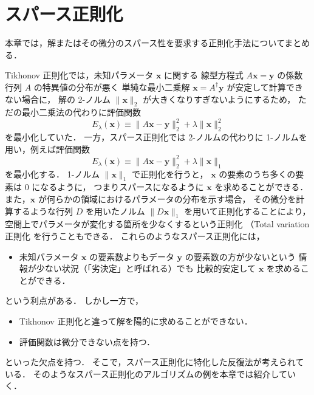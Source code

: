 %

\chapter{スパース正則化}\label{chap:regularization_sparse}

本章では，解またはその微分のスパース性を要求する正則化手法についてまとめる．

Tikhonov 正則化では，未知パラメータ $\bm{x}$ に関する
線型方程式 $A \bm{x} = \bm{y}$ の係数行列 $A$ の特異値の分布が悪く
単純な最小二乗解 $\bm{x} = A^\dagger \bm{y}$ が安定して計算できない場合に，
解の 2-ノルム $\|\bm{x}\|_2$ が大きくなりすぎないようにするため，
ただの最小二乗法の代わりに評価関数
\begin{equation}
    E_{\lambda}(\bm{x}) \equiv \|A \bm{x} - \bm{y}\|_2^2 + \lambda \|\bm{x}\|_2^2
\end{equation}
を最小化していた．
一方，スパース正則化では 2-ノルムの代わりに 1-ノルムを用い，例えば評価関数
\begin{equation}
    E_{\lambda}(\bm{x}) \equiv \|A \bm{x} - \bm{y}\|_2^2 + \lambda \|\bm{x}\|_1
\end{equation}
を最小化する．
1-ノルム $\|\bm{x}\|_1$ で正則化を行うと，
$\bm{x}$ の要素のうち多くの要素は 0 になるように，
つまりスパースになるように $\bm{x}$ を求めることができる．
また，$\bm{x}$ が何らかの領域におけるパラメータの分布を示す場合，
その微分を計算するような行列 $D$ を用いたノルム $\|D \bm{x}\|_1$ を用いて正則化することにより，
空間上でパラメータが変化する箇所を少なくするという正則化
（Total variation 正則化
を行うこともできる．
これらのようなスパース正則化には，
\begin{itemize}
    \item 未知パラメータ $\bm{x}$ の要素数よりもデータ $\bm{y}$ の要素数の方が少ないという
          情報が少ない状況（「劣決定」と呼ばれる）でも
          比較的安定して $\bm{x}$ を求めることができる．
\end{itemize}
という利点がある．
しかし一方で，
\begin{itemize}
    \item Tikhonov 正則化と違って解を陽的に求めることができない．
    \item 評価関数は微分できない点を持つ．
\end{itemize}
といった欠点を持つ．
そこで，スパース正則化に特化した反復法が考えられている．
そのようなスパース正則化のアルゴリズムの例を本章では紹介していく．





